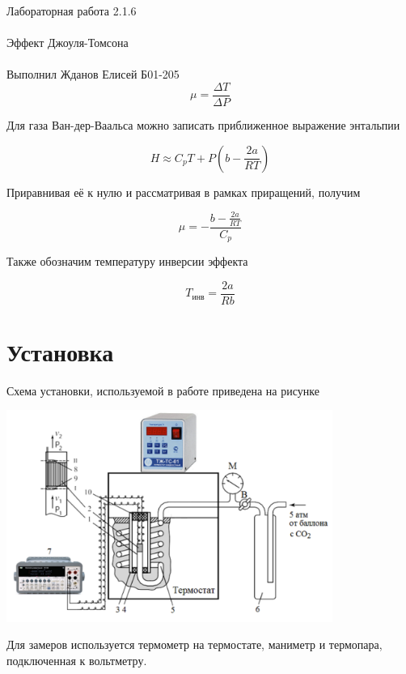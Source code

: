 \documentclass{astroedu-lab}
\begin{document}
\begin{problem}{\huge Лабораторная работа 2.1.6\\\\Эффект Джоуля-Томсона\\\\Выполнил Жданов Елисей Б01-205}
\begin{equation}
	\mu = \frac{\Delta T}{\Delta P}
\end{equation}

Для газа Ван-дер-Ваальса можно записать приближенное выражение энтальпии

\begin{equation}
	H \approx C_p T + P \left( b - \frac{2 a}{R T} \right)
\end{equation}

Приравнивая её к нулю и рассматривая в рамках приращений, получим

\begin{equation}
	\boxed{\mu = - \frac{b - \frac{2 a}{R T}}{C_p}}
\end{equation}

Также обозначим температуру инверсии эффекта

\begin{equation}
	\boxed{T_\text{инв} = \frac{2 a }{R b}}
\end{equation}


\section{Установка}
Схема установки, используемой в работе приведена на рисунке\\
 
\begin{center}
\includegraphics[width=0.8\textwidth]{st.png}
\label{ris:image}
\end{center}

Для замеров используется термометр на термостате, маниметр и термопара, подключенная к вольтметру.


\end{problem}
\end{document}
